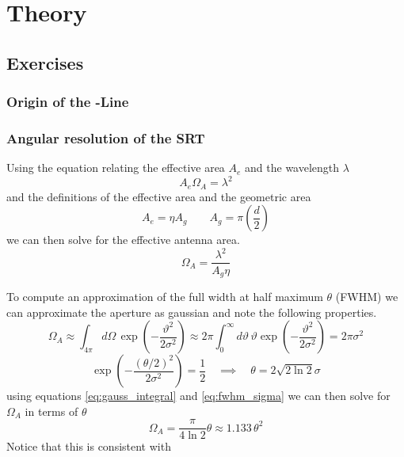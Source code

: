 \section{Theory}
\subsection{Exercises}
\subsubsection[Origin of the HI-Line]{Origin of the -Line}

\subsubsection{Angular resolution of the SRT}\label{sec:ang_res}
Using the equation relating the effective area $A_e$ and the wavelength $\lambda$ \cite[p. 149]{wilson_tools_2009}
\begin{equation}
    A_e \Omega_A = \lambda^2
\end{equation}
and the definitions of the effective area and the geometric area \cite[p. 148]{wilson_tools_2009}
\begin{equation}
    A_e = \eta A_g \qquad A_g = \pi \left( \frac{d}{2} \right) \label{eq:A_e}
\end{equation}
we can then solve for the effective antenna area.
\begin{equation}
    \Omega_A = \frac{\lambda^2}{A_g \eta} \label{eq:Omega_A}
\end{equation}


To compute an approximation of the full width at half maximum $\theta$ (FWHM) we can approximate the aperture as gaussian \cite[p. 2]{srt} and note the following properties.
\begin{equation}
    \Omega_A \approx \int_{4\pi } d\Omega\, \exp{\left( -\frac{\vartheta^2}{2\sigma^2} \right)} \approx 2\pi \int_0^{\infty} d\vartheta \, \vartheta \exp{\left( -\frac{\vartheta^2}{2\sigma^2} \right)} = 2\pi \sigma^2
    \label{eq:gauss_integral}
\end{equation}
\begin{equation}
    \exp{\left( -\frac{(\theta/2)^2}{2\sigma^2}\right)} = \frac{1}{2} \quad \implies \quad \theta = 2 \sqrt{2\ln{2}} \sigma \label{eq:fwhm_sigma}
\end{equation}
using equations \eqref{eq:gauss_integral} and \eqref{eq:fwhm_sigma} we can then solve for $\Omega_A$ in terms of $\theta$
\begin{equation}
    \Omega_A = \frac{\pi}{4\ln{2}} \theta \approx 1.133 \, \theta^2 \label{eq:Omega_A_fwhhm}
\end{equation}
Notice that this is consistent with \cite[p.178 (8.13)]{wilson_tools_2009}

